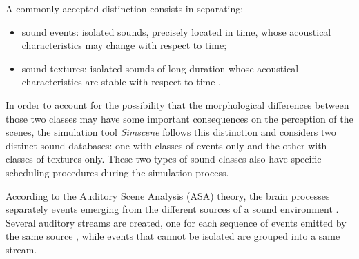 \documentclass[12pt]{elsarticle}
\newcommand{\ie}{\emph{i.\,e.}}
\begin{document}
 A commonly accepted distinction consists in separating:

\begin{itemize}
\item {sound events}: isolated sounds, precisely located in time, whose acoustical characteristics may change with respect to time;
\item {sound textures}: isolated sounds of long duration whose acoustical characteristics are stable with respect to time \cite{saint1995classification}.
\end{itemize}



In order to account for the possibility that the morphological differences between those two classes may have some important consequences on the perception of the scenes, the simulation tool \emph{Simscene} follows this distinction and considers two distinct sound databases: one with classes of events only and the other with classes of textures only. These two types of sound classes also have specific scheduling procedures during the simulation process.


According to the Auditory Scene Analysis (ASA) theory, the brain processes separately events emerging from the different sources of a sound environment \cite{bregman1994auditory}. Several auditory streams are created, one for each sequence of events emitted by the same source \cite{carlyon2004brain}, while events that cannot be isolated are grouped into a same stream.

\end{document}
